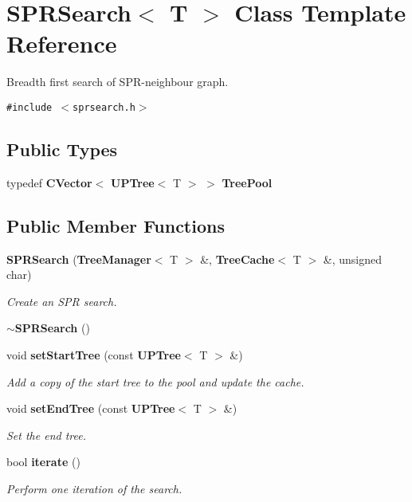 \section{SPRSearch$<$ T $>$ Class Template Reference}
\label{classSPRSearch}
Breadth first search of SPR-neighbour graph.  


{\tt \#include $<$sprsearch.h$>$}

\subsection*{Public Types}
\begin{CompactItemize}
\item 
typedef {\bf CVector}$<$ {\bf UPTree}$<$ T $>$ $>$ {\bf Tree\-Pool}
\end{CompactItemize}
\subsection*{Public Member Functions}
\begin{CompactItemize}
\item 
{\bf SPRSearch} ({\bf Tree\-Manager}$<$ T $>$ \&, {\bf Tree\-Cache}$<$ T $>$ \&, unsigned char)
\begin{CompactList}\small\item\em Create an SPR search. \item\end{CompactList}\item 
{\bf $\sim$SPRSearch} ()
\item 
void {\bf set\-Start\-Tree} (const {\bf UPTree}$<$ T $>$ \&)
\begin{CompactList}\small\item\em Add a copy of the start tree to the pool and update the cache. \item\end{CompactList}\item 
void {\bf set\-End\-Tree} (const {\bf UPTree}$<$ T $>$ \&)
\begin{CompactList}\small\item\em Set the end tree. \item\end{CompactList}\item 
bool {\bf iterate} ()
\begin{CompactList}\small\item\em Perform one iteration of the search. \item\end{CompactList}\end{CompactItemize}
